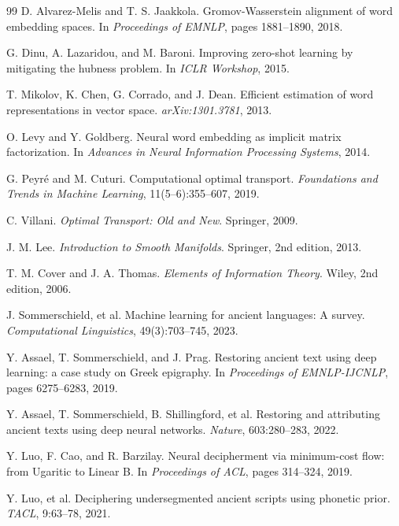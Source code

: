 \documentclass[11pt,a4paper]{article}
\newcommand{\1}{\mathbf{1}}
\numberwithin{equation}{section}
\begin{document}
\begin{thebibliography}{99}
D. Alvarez-Melis and T. S. Jaakkola.
\newblock Gromov-Wasserstein alignment of word embedding spaces.
\newblock In \emph{Proceedings of EMNLP}, pages 1881--1890, 2018.

G. Dinu, A. Lazaridou, and M. Baroni.
\newblock Improving zero-shot learning by mitigating the hubness problem.
\newblock In \emph{ICLR Workshop}, 2015.

T. Mikolov, K. Chen, G. Corrado, and J. Dean.
\newblock Efficient estimation of word representations in vector space.
\newblock \emph{arXiv:1301.3781}, 2013.

O. Levy and Y. Goldberg.
\newblock Neural word embedding as implicit matrix factorization.
\newblock In \emph{Advances in Neural Information Processing Systems}, 2014.

G. Peyr{\'e} and M. Cuturi.
\newblock Computational optimal transport.
\newblock \emph{Foundations and Trends in Machine Learning}, 11(5--6):355--607, 2019.

C. Villani.
\newblock \emph{Optimal Transport: Old and New}.
\newblock Springer, 2009.

J. M. Lee.
\newblock \emph{Introduction to Smooth Manifolds}.
\newblock Springer, 2nd edition, 2013.

T. M. Cover and J. A. Thomas.
\newblock \emph{Elements of Information Theory}.
\newblock Wiley, 2nd edition, 2006.

J. Sommerschield, et al.
\newblock Machine learning for ancient languages: A survey.
\newblock \emph{Computational Linguistics}, 49(3):703--745, 2023.

Y. Assael, T. Sommerschield, and J. Prag.
\newblock Restoring ancient text using deep learning: a case study on Greek epigraphy.
\newblock In \emph{Proceedings of EMNLP-IJCNLP}, pages 6275--6283, 2019.

Y. Assael, T. Sommerschield, B. Shillingford, et al.
\newblock Restoring and attributing ancient texts using deep neural networks.
\newblock \emph{Nature}, 603:280--283, 2022.

Y. Luo, F. Cao, and R. Barzilay.
\newblock Neural decipherment via minimum-cost flow: from Ugaritic to Linear B.
\newblock In \emph{Proceedings of ACL}, pages 314--324, 2019.

Y. Luo, et al.
\newblock Deciphering undersegmented ancient scripts using phonetic prior.
\newblock \emph{TACL}, 9:63--78, 2021.


\end{thebibliography}
\end{document}
